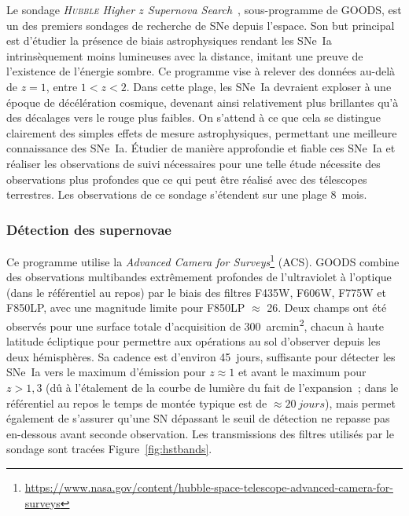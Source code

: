 \documentclass[../main/main.tex]{subfiles}
\begin{document}
Le sondage \textit{\textsc{Hubble} Higher $z$ Supernova
Search}~\citep[HHZSS,][]{strolger2004}, sous-programme de GOODS, est un des
premiers sondages de recherche de SNe depuis l'espace. Son but principal est
d'étudier la présence de biais astrophysiques rendant les SNe~Ia intrinsèquement
moins lumineuses avec la distance, imitant une preuve de l'existence de
l'énergie sombre. Ce programme vise à relever des données au-delà de $z = 1$,
entre $1 < z < 2$. Dans cette plage, les SNe~Ia devraient exploser à une époque
de décélération cosmique, devenant ainsi relativement plus brillantes qu'à des
décalages vers le rouge plus faibles. On s'attend à ce que cela se distingue
clairement des simples effets de mesure astrophysiques, permettant une meilleure
connaissance des SNe~Ia. Étudier de manière approfondie et fiable ces SNe~Ia et
réaliser les observations de suivi nécessaires pour une telle étude nécessite
des observations plus profondes que ce qui peut être réalisé avec des télescopes
terrestres. Les observations de ce sondage s'étendent sur une plage
\SI{8}{mois}.

\subsubsection{Détection des supernovae}\label{sssec:hstdetec}

Ce programme utilise la \textit{Advanced Camera for
Surveys}\footnote{\href{https://www.nasa.gov/content/hubble-space-telescope-advanced-camera-for-surveys}
{https://www.nasa.gov/content/hubble-space-telescope-advanced-camera-for-surveys}}
(ACS). GOODS combine des observations multibandes extrêmement profondes de
l'ultraviolet à l'optique (dans le référentiel au repos) par le biais des
filtres F435W, F606W, F775W et F850LP, avec une magnitude limite pour F850LP
$\approx$ 26. Deux champs ont été observés pour une
surface totale d'acquisition de \SI{300}{arcmin^2}, chacun à haute latitude
écliptique pour permettre aux opérations au sol d'observer depuis les deux
hémisphères. Sa cadence est d'environ \SI{45}{jours}, suffisante pour détecter
les SNe~Ia vers le maximum d'émission pour $z \approx 1$ et avant le maximum
pour $z > 1,3$ (dû à l'étalement de la courbe de lumière du fait de
l'expansion~; dans le référentiel au repos le temps de montée typique est de
$\approx \SI{20}{jours}$), mais permet également de s'assurer qu'une SN
dépassant le seuil de détection ne repasse pas en-dessous avant seconde
observation. Les transmissions des filtres utilisés par le sondage sont tracées
Figure~\ref{fig:hstbands}.
\end{document}

